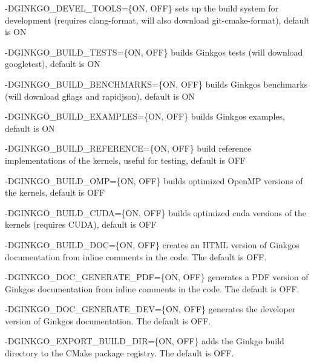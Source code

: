 \begin{DoxyItemize}
\item {\ttfamily -\/\+D\+G\+I\+N\+K\+G\+O\+\_\+\+D\+E\+V\+E\+L\+\_\+\+T\+O\+O\+LS=\{ON, O\+FF\}} sets up the build system for development (requires clang-\/format, will also download git-\/cmake-\/format), default is {\ttfamily ON}
\item {\ttfamily -\/\+D\+G\+I\+N\+K\+G\+O\+\_\+\+B\+U\+I\+L\+D\+\_\+\+T\+E\+S\+TS=\{ON, O\+FF\}} builds Ginkgo\textquotesingle{}s tests (will download googletest), default is {\ttfamily ON}
\item {\ttfamily -\/\+D\+G\+I\+N\+K\+G\+O\+\_\+\+B\+U\+I\+L\+D\+\_\+\+B\+E\+N\+C\+H\+M\+A\+R\+KS=\{ON, O\+FF\}} builds Ginkgo\textquotesingle{}s benchmarks (will download gflags and rapidjson), default is {\ttfamily ON}
\item {\ttfamily -\/\+D\+G\+I\+N\+K\+G\+O\+\_\+\+B\+U\+I\+L\+D\+\_\+\+E\+X\+A\+M\+P\+L\+ES=\{ON, O\+FF\}} builds Ginkgo\textquotesingle{}s examples, default is {\ttfamily ON}
\item {\ttfamily -\/\+D\+G\+I\+N\+K\+G\+O\+\_\+\+B\+U\+I\+L\+D\+\_\+\+R\+E\+F\+E\+R\+E\+N\+CE=\{ON, O\+FF\}} build reference implementations of the kernels, useful for testing, default is {\ttfamily O\+FF}
\item {\ttfamily -\/\+D\+G\+I\+N\+K\+G\+O\+\_\+\+B\+U\+I\+L\+D\+\_\+\+O\+MP=\{ON, O\+FF\}} builds optimized Open\+MP versions of the kernels, default is {\ttfamily O\+FF}
\item {\ttfamily -\/\+D\+G\+I\+N\+K\+G\+O\+\_\+\+B\+U\+I\+L\+D\+\_\+\+C\+U\+DA=\{ON, O\+FF\}} builds optimized cuda versions of the kernels (requires C\+U\+DA), default is {\ttfamily O\+FF}
\item {\ttfamily -\/\+D\+G\+I\+N\+K\+G\+O\+\_\+\+B\+U\+I\+L\+D\+\_\+\+D\+OC=\{ON, O\+FF\}} creates an H\+T\+ML version of Ginkgo\textquotesingle{}s documentation from inline comments in the code. The default is {\ttfamily O\+FF}.
\item {\ttfamily -\/\+D\+G\+I\+N\+K\+G\+O\+\_\+\+D\+O\+C\+\_\+\+G\+E\+N\+E\+R\+A\+T\+E\+\_\+\+P\+DF=\{ON, O\+FF\}} generates a P\+DF version of Ginkgo\textquotesingle{}s documentation from inline comments in the code. The default is {\ttfamily O\+FF}.
\item {\ttfamily -\/\+D\+G\+I\+N\+K\+G\+O\+\_\+\+D\+O\+C\+\_\+\+G\+E\+N\+E\+R\+A\+T\+E\+\_\+\+D\+EV=\{ON, O\+FF\}} generates the developer version of Ginkgo\textquotesingle{}s documentation. The default is {\ttfamily O\+FF}.
\item {\ttfamily -\/\+D\+G\+I\+N\+K\+G\+O\+\_\+\+E\+X\+P\+O\+R\+T\+\_\+\+B\+U\+I\+L\+D\+\_\+\+D\+IR=\{ON, O\+FF\}} adds the Ginkgo build directory to the C\+Make package registry. The default is {\ttfamily O\+FF}.

\end{DoxyItemize}
